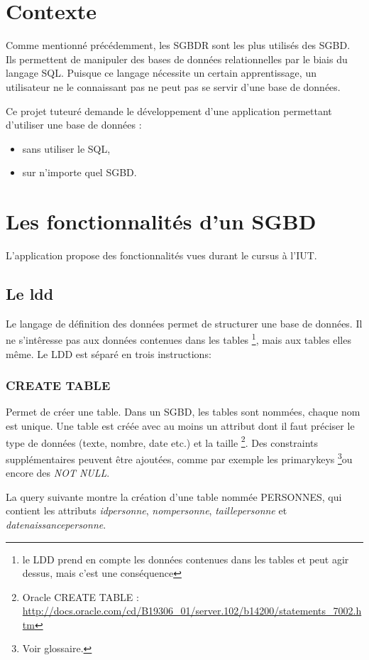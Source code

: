 \section{Contexte}
Comme mentionné précédemment, les SGBDR sont les plus utilisés des SGBD. Ils permettent de manipuler des bases de données relationnelles
par le biais du langage SQL. Puisque ce langage nécessite un certain apprentissage, un utilisateur ne le connaissant pas ne peut pas se servir
d'une base de données.

Ce projet tuteuré demande le développement d'une application permettant d'utiliser une base de données :
\begin{itemize}
\item sans utiliser le SQL,
\item sur n'importe quel SGBD.
\end{itemize}

\section{Les fonctionnalités d'un SGBD}
L'application propose des fonctionnalités vues durant le cursus à l'IUT.

\subsection{Le \gls{ldd}}
Le langage de définition des données permet de structurer une base de données.
Il ne s'intêresse pas aux données contenues dans les tables
\footnote{\label{interet_ldd}le LDD prend en compte les données contenues dans les tables et peut agir dessus, mais c'est une conséquence}, mais aux tables elles même. Le LDD est séparé en trois instructions:

\subsubsection{CREATE TABLE}
Permet de créer une \gls{table}. Dans un SGBD, les tables sont nommées, chaque nom est unique.
Une table est créée avec au moins un attribut dont il faut préciser le type de données (texte, nombre, date etc.) et la taille
\footnote{\label{oracle_create_table_url} Oracle CREATE TABLE : \url{http://docs.oracle.com/cd/B19306_01/server.102/b14200/statements_7002.htm}}.
Des \glspl{constraint} supplémentaires peuvent être ajoutées, comme par exemple les \glspl{primarykey} \footnote{\label{contrainte_clée_primaire}Voir glossaire.}ou encore des \textit{NOT NULL}.

La \gls{query} suivante montre la création d'une table nommée PERSONNES, qui contient les attributs \textit{idpersonne}, \textit{nompersonne}, \textit{taillepersonne} et \textit{datenaissancepersonne}.

